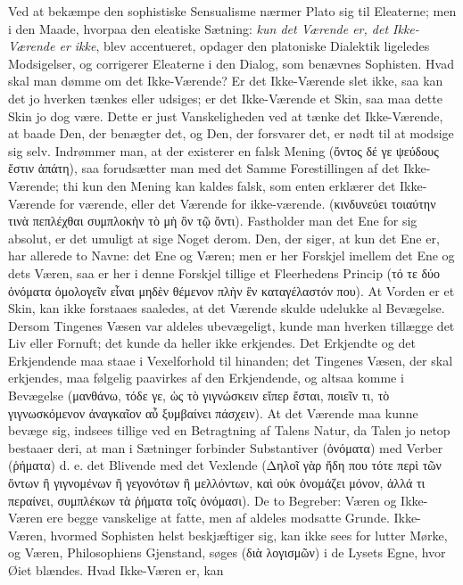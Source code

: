 \documentclass[12pt]{book}
\newcommand{\opage}[1]{\marginnote{\footnotesize\textit{[#1]}}}
\begin{document}
\opage{128} Ved at bekæmpe den sophistiske Sensualisme nærmer Plato sig til Eleaterne; men i den Maade,
hvorpaa den eleatiske Sætning: \emph{kun det Værende er, det Ikke-Værende er ikke}, blev
accentueret, opdager den platoniske Dialektik ligeledes Modsigelser, og corrigerer Eleaterne i
den Dialog, som benævnes Sophisten. Hvad skal man dømme om det Ikke-Værende? Er det Ikke-Værende
slet ikke, saa kan det jo hverken tænkes eller udsiges; er det Ikke-Værende et Skin, saa maa
dette Skin jo dog være. Dette er just Vanskeligheden ved at tænke det Ikke-Værende, at baade
Den, der benægter det, og Den, der forsvarer det, er nødt til at modsige sig selv. Indrømmer
man, at der existerer en falsk Mening (ὄντος δέ γε ψεύδους ἔστιν ἀπάτη), saa forudsætter man med
det Samme Forestillingen af det Ikke-Værende; thi kun den Mening kan kaldes falsk, som enten
erklærer det Ikke-Værende for værende, eller det Værende for ikke-værende. (κινδυνεύει τοιαύτην
τινὰ πεπλέχθαι συμπλοκὴν τὸ μὴ ὂν τῷ ὄντι). Fastholder man det Ene for sig absolut, er det
umuligt at sige Noget derom. Den, der siger, at kun det Ene er, har allerede to Navne: det Ene
og Væren; men er her Forskjel imellem det Ene og dets Væren, saa er her i denne Forskjel tillige
et Fleerhedens Princip (τό τε δύο ὀνόματα ὁμολογεῖν εἶναι μηδὲν θέμενον πλὴν ἓν καταγέλαστόν που).
At Vorden er et Skin, kan ikke forstaaes saaledes, at det Værende skulde udelukke al Bevægelse.
Dersom Tingenes Væsen var aldeles ubevægeligt, kunde man hverken tillægge det Liv eller Fornuft;
det kunde da heller ikke erkjendes. Det Erkjendte og det Erkjendende maa staae i Vexelforhold
til hinanden; det Tingenes Væsen, der skal erkjendes, maa følgelig paavirkes af den Erkjendende,
og altsaa komme i Bevægelse (μανθάνω, τόδε γε, ὡς τὸ γιγνώσκειν εἴπερ ἔσται, ποιεῖν τι, τὸ
γιγνωσκόμενον ἀναγκαῖον αὖ ξυμβαίνει πάσχειν). At det Værende maa kunne bevæge sig, indsees
tillige ved en Betragtning af Talens Natur, da Talen jo netop bestaaer deri, at man i
\opage{129} Sætninger forbinder Substantiver (ὀνόματα) med Verber (ῥήματα) d. e. det Blivende med det
Vexlende (Δηλοῖ γὰρ ἤδη που τότε περὶ τῶν ὄντων ἢ γιγνομένων ἢ γεγονότων ἢ μελλόντων, καὶ οὐκ
ὀνομάζει μόνον, ἀλλά τι περαίνει, συμπλέκων τὰ ῥήματα τοῖς ὀνόμασι). De to Begreber: Væren og
Ikke-Væren ere begge vanskelige at fatte, men af aldeles modsatte Grunde. Ikke-Væren, hvormed
Sophisten helst beskjæftiger sig, kan ikke sees for lutter Mørke, og Væren, Philosophiens
Gjenstand, søges (διὰ λογισμῶν) i de Lysets Egne, hvor Øiet blændes. Hvad Ikke-Væren er, kan
\end{document}

